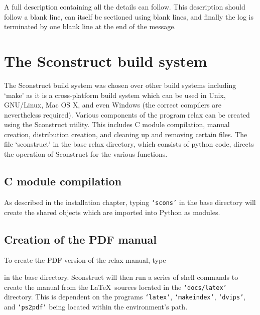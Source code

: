 A full description containing all the details can follow.  This description should follow a blank line, can itself be sectioned using blank lines, and finally the log is terminated by one blank line at the end of the message.




\section{The Sconstruct build system}

The Sconstruct build system was chosen over other build systems including `make' as it is a cross-platform build system which can be used in Unix, GNU/Linux, Mac OS X, and even Windows (the correct compilers are nevertheless required).  Various components of the program relax can be created using the Sconstruct utility.  This includes C module compilation, manual creation, distribution creation, and cleaning up and removing certain files.  The file `sconstruct' in the base relax directory, which consists of python code, directs the operation of Sconstruct for the various functions.


\subsection{C module compilation}

As described in the installation chapter, typing \texttt{`scons'} in the base directory will create the shared objects which are imported into Python as modules.


\subsection{Creation of the PDF manual}

To create the PDF version of the relax manual, type


in the base directory.  Sconstruct will then run a series of shell commands to create the manual from the \LaTeX\ sources located in the \texttt{`docs/latex'} directory.  This is dependent on the programs \texttt{`latex'}, \texttt{`makeindex'}, \texttt{`dvips'}, and \texttt{`ps2pdf'} being located within the environment's path.


